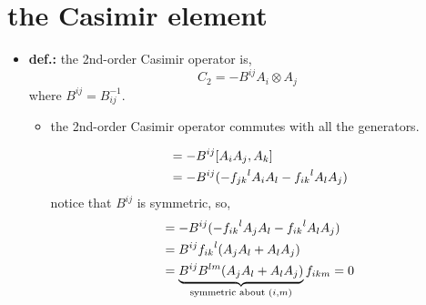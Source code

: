 \section{the Casimir element}
\begin{itemize}
	\item \textbf{\textbf{def.:}} the 2nd-order Casimir operator is,
	\begin{equation}
		C_2 = - B^{i j} A_i \otimes A_j
	\end{equation}
	where $B^{i j} = B^{- 1}_{i j}$.
	\begin{itemize}
		\item the 2nd-order Casimir operator commutes with all the generators.
		
		\begin{tcolorbox}[title=proof:]
			\begin{align}
				[C_2, A_k] &= - B^{i j} [A_i A_j, A_k] \notag \\
				&= - B^{i j} (- {f_{j k}}^l A_i A_l - {f_{i k}}^l A_l A_j)
			\end{align}
			notice that $B^{i j}$ is symmetric, so,
			\begin{align}
				[C_2, A_k] &= - B^{i j} (- {f_{i k}}^l A_j A_l - {f_{i k}}^l A_l A_j) \notag \\
				&= B^{i j} {f_{i k}}^l (A_j A_l + A_l A_j) \notag \\
				&= \underbrace{B^{i j} B^{l m} (A_j A_l + A_l A_j)}_{\text{symmetric about } (i, m)} f_{i k m} = 0
			\end{align}
		\end{tcolorbox}
	\end{itemize}
\end{itemize}
